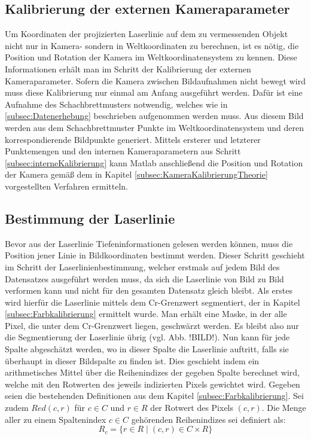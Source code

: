 \subsection{Kalibrierung der externen Kameraparameter}
\label{subsec:externeKalibrierung}
Um Koordinaten der projizierten Laserlinie auf dem zu vermessenden Objekt nicht nur in Kamera- sondern in Weltkoordinaten zu berechnen, ist es nötig, die Position und Rotation der Kamera im Weltkoordinatensystem zu kennen. Diese Informationen erhält man im Schritt der Kalibrierung der externen Kameraparameter. Sofern die Kamera zwischen Bildaufnahmen nicht bewegt wird muss diese Kalibrierung nur einmal am Anfang ausgeführt werden. Dafür ist eine Aufnahme des Schachbrettmusters notwendig, welches wie in \ref{subsec:Datenerhebung} beschrieben aufgenommen werden muss. Aus diesem Bild werden aus dem Schachbrettmuster Punkte im Weltkoordinatensystem und deren korrespondierende Bildpunkte generiert. Mittels ersterer und letzterer Punktemengen und den internen Kameraparametern aus Schritt \ref{subsec:interneKalibrierung} kann Matlab anschließend die Position und Rotation der Kamera gemäß dem in Kapitel \ref{subsec:KameraKalibrierungTheorie} vorgestellten Verfahren ermitteln.

\subsection{Bestimmung der Laserlinie}
\label{subsec:LaserLinieBestimmung}
Bevor aus der Laserlinie Tiefeninformationen gelesen werden können, muss die Position jener Linie in Bildkoordinaten bestimmt werden. Dieser Schritt geschieht im Schritt der Laserlinienbestimmung, welcher erstmals auf jedem Bild des Datensatzes ausgeführt werden muss, da sich die Laserlinie von Bild zu Bild verformen kann und nicht für den gesamten Datensatz gleich bleibt. Als erstes wird hierfür die Laserlinie mittels dem Cr-Grenzwert segmentiert, der in Kapitel \ref{subsec:Farbkalibrierung} ermittelt wurde. Man erhält eine Maske, in der alle Pixel, die unter dem Cr-Grenzwert liegen, geschwärzt werden. Es bleibt also nur die Segmentierung der Laserlinie übrig (vgl. Abb. !BILD!). Nun kann für jede Spalte abgeschätzt werden, wo in dieser Spalte die Laserlinie auftritt, falls sie überhaupt in dieser Bildspalte zu finden ist. Dies geschieht indem ein arithmetisches Mittel über die Reihenindizes der gegeben Spalte berechnet wird, welche mit den Rotwerten des jeweils indizierten Pixels gewichtet wird. Gegeben seien die bestehenden Definitionen aus dem Kapitel \ref{subsec:Farbkalibrierung}. Sei zudem \(Red(c,r)\) für \(c \in C\) und \(r \in R\) der Rotwert des Pixels \((c,r)\). Die Menge aller zu einem Spaltenindex \(c \in C\) gehörenden Reihenindizes sei definiert als:
\begin{equation}
R_{c} = \lbrace r \in R \mid (c, r) \in C \times R \rbrace
\end{equation}

